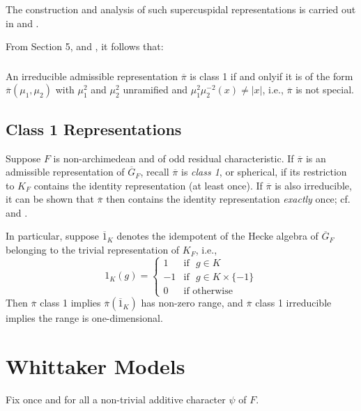 The construction and analysis of such supercuspidal representations is carried out in \cite{RS} and \cite{Meister}.

From \cite{Ge} Section 5, and \cite{Meister}, it follows that:

\subsubsection{}\label{art1-sec2.4.1}
An irreducible admissible representation $\overline{\pi}$ is class 1 if and only\pageoriginale if it is of the form $\overline{\pi}(\mu_{1},\mu_{2})$ with $\mu^{2}_{1}$ and $\mu^{2}_{2}$ unramified and $\mu^{2}_{1}\mu^{-2}_{2}(x)\neq |x|$, i.e., $\overline{\pi}$ is not special.

\subsection{Class 1 Representations}\label{art1-sec2.5}
Suppose $F$ is non-archimedean and of odd residual characteristic. If $\overline{\pi}$ is an admissible representation of $\overline{G}_{F}$, recall $\overline{\pi}$ is {\em class 1}, or spherical, if its restriction to $K_{F}$ contains the identity representation (at least once). If $\overline{\pi}$ is also irreducible, it can be shown that $\overline{\pi}$ then contains the identity representation {\em exactly} once; cf. \cite{Ge} and \cite{Meister}.

In particular, suppose $\overline{1}_{K}$ denotes the idempotent of the Hecke algebra of $\overline{G}_{F}$ belonging to the trivial representation of $K_{F}$, i.e.,
$$
1_{K}(g)=
\begin{cases}
1 & \text{if~ } g\in K\\
-1 & \text{if~ } g\in K\times \{-1\}\\
0  & \text{if otherwise}
\end{cases}
$$
Then $\overline{\pi}$ class 1 implies $\overline{\pi}(\overline{1}_{K})$ has non-zero range, and $\overline{\pi}$ class 1 irreducible implies the range is one-dimensional.

\section{Whittaker Models}\label{art1-sec3}

Fix once and for all a non-trivial additive character $\psi$ of $F$.

